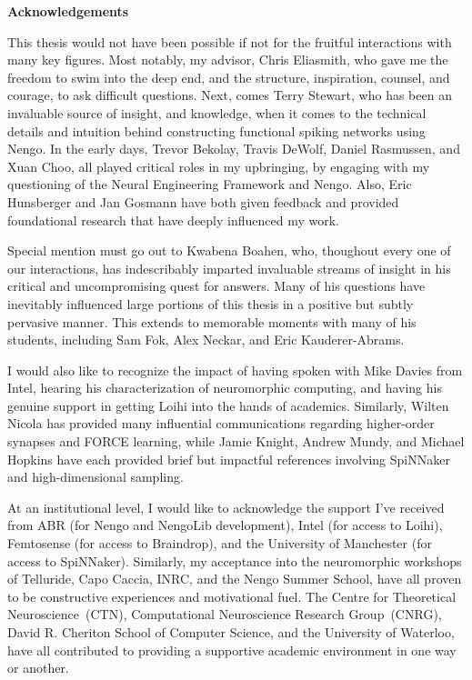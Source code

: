 {}
\begin{center}\textbf{Acknowledgements}\end{center}

This thesis would not have been possible if not for the fruitful interactions with many key figures.
Most notably, my advisor, Chris Eliasmith, who gave me the freedom to swim into the deep end, and the structure, inspiration, counsel, and courage, to ask difficult questions.
Next, comes Terry Stewart, who has been an invaluable source of insight, and knowledge, when it comes to the technical details and intuition behind constructing functional spiking networks using Nengo.
In the early days, Trevor Bekolay, Travis DeWolf, Daniel Rasmussen, and Xuan Choo, all played critical roles in my upbringing, by engaging with my questioning of the Neural Engineering Framework and Nengo.
Also, Eric Hunsberger and Jan Gosmann have both given feedback and provided foundational research that have deeply influenced my work.

Special mention must go out to Kwabena Boahen, who, thoughout every one of our interactions, has indescribably imparted invaluable streams of insight in his critical and uncompromising quest for answers.
Many of his questions have inevitably influenced large portions of this thesis in a positive but subtly pervasive manner.
This extends to memorable moments with many of his students, including Sam Fok, Alex Neckar, and Eric Kauderer-Abrams.

I would also like to recognize the impact of having spoken with Mike Davies from Intel, hearing his characterization of neuromorphic computing, and having his genuine support in getting Loihi into the hands of academics.
Similarly, Wilten Nicola has provided many influential communications regarding higher-order synapses and FORCE learning, while Jamie Knight, Andrew Mundy, and Michael Hopkins have each provided brief but impactful references involving SpiNNaker and high-dimensional sampling.

At an institutional level, I would like to acknowledge the support I've received from
ABR (for Nengo and NengoLib development),
Intel (for access to Loihi),
Femtosense (for access to Braindrop),
and the University of Manchester (for access to SpiNNaker).
Similarly, my acceptance into the neuromorphic workshops of Telluride, Capo Caccia, INRC, and the Nengo Summer School, have all proven to be constructive experiences and motivational fuel.
The Centre for Theoretical Neuroscience~(CTN), Computational Neuroscience Research Group~(CNRG), David R. Cheriton School of Computer Science, and the University of Waterloo, have all contributed to providing a supportive academic environment in one way or another.  

